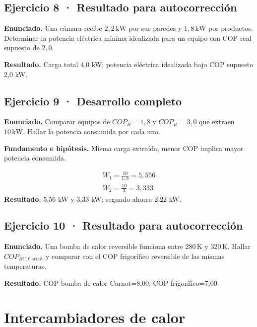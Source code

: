 \documentclass[11pt,a4paper]{article}
\begin{document}
\subsection*{Ejercicio 8 · Resultado para autocorrección}
\textbf{Enunciado.} Una cámara recibe \(2{,}2\,\mathrm{kW}\) por sus paredes y \(1{,}8\,\mathrm{kW}\) por productos. Determinar la potencia eléctrica mínima idealizada para un equipo con COP real supuesto de \(2{,}0\).

\textbf{Resultado.} Carga total 4,0 kW; potencia eléctrica idealizada bajo COP supuesto 2,0 kW.


\subsection*{Ejercicio 9 · Desarrollo completo}
\textbf{Enunciado.} Comparar equipos de \(COP_R=1{,}8\) y \(COP_R=3{,}0\) que extraen \(10\,\mathrm{kW}\). Hallar la potencia consumida por cada uno.

\textbf{Fundamento e hipótesis.} Misma carga extraída, menor COP implica mayor potencia consumida.

\[
\begin{gathered}
W_1=\frac{10}{1{,}8}=5{,}556\\W_2=\frac{10}{3}=3{,}333
\end{gathered}
\]
\textbf{Resultado.} 5,56 kW y 3,33 kW; segundo ahorra 2,22 kW.


\subsection*{Ejercicio 10 · Resultado para autocorrección}
\textbf{Enunciado.} Una bomba de calor reversible funciona entre \(280\,\mathrm K\) y \(320\,\mathrm K\). Hallar \(COP_{BC,\mathrm{Carnot}}\) y comparar con el COP frigorífico reversible de las mismas temperaturas.

\textbf{Resultado.} COP bomba de calor Carnot=8,00; COP frigorífico=7,00.


\clearpage

\section{Intercambiadores de calor}

\begin{center}\end{center}
\end{document}
